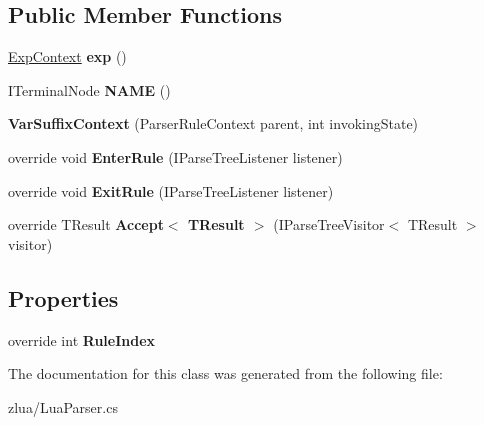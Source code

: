 \subsection*{Public Member Functions}
\begin{DoxyCompactItemize}
\item 
\mbox{\label{classzlua_1_1_lua_parser_1_1_var_suffix_context_a80e075db15bc645e5ff9e8bbbaf053b8}} 
\mbox{\hyperlink{classzlua_1_1_lua_parser_1_1_exp_context}{Exp\+Context}} {\bfseries exp} ()
\item 
\mbox{\label{classzlua_1_1_lua_parser_1_1_var_suffix_context_a7730424c73351a5c6e3e1250fe0ec607}} 
I\+Terminal\+Node {\bfseries N\+A\+ME} ()
\item 
\mbox{\label{classzlua_1_1_lua_parser_1_1_var_suffix_context_a1017709b6c7ef4b9d68c77ec7b36d354}} 
{\bfseries Var\+Suffix\+Context} (Parser\+Rule\+Context parent, int invoking\+State)
\item 
\mbox{\label{classzlua_1_1_lua_parser_1_1_var_suffix_context_a67b2b85c25bdea9094047f8ca641954d}} 
override void {\bfseries Enter\+Rule} (I\+Parse\+Tree\+Listener listener)
\item 
\mbox{\label{classzlua_1_1_lua_parser_1_1_var_suffix_context_a06eb35ad8220a24cdf0598a603e6f65b}} 
override void {\bfseries Exit\+Rule} (I\+Parse\+Tree\+Listener listener)
\item 
\mbox{\label{classzlua_1_1_lua_parser_1_1_var_suffix_context_a85ee9982979caea24f246cef1c22d344}} 
override T\+Result {\bfseries Accept$<$ T\+Result $>$} (I\+Parse\+Tree\+Visitor$<$ T\+Result $>$ visitor)
\end{DoxyCompactItemize}
\subsection*{Properties}
\begin{DoxyCompactItemize}
\item 
\mbox{\label{classzlua_1_1_lua_parser_1_1_var_suffix_context_ac5fffe9ea52e7ec73355ec13609e631e}} 
override int {\bfseries Rule\+Index}
\end{DoxyCompactItemize}


The documentation for this class was generated from the following file\+:\begin{DoxyCompactItemize}
\item 
zlua/Lua\+Parser.\+cs\end{DoxyCompactItemize}
